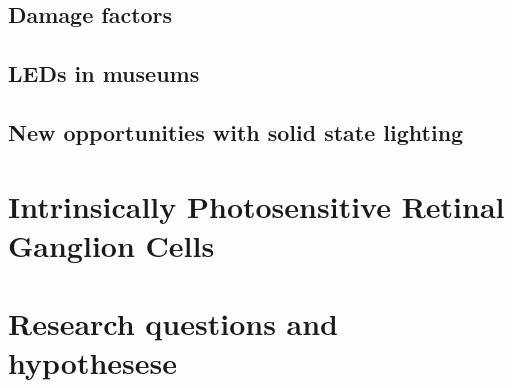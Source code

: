 \subsection{Damage factors}
\subsection{LEDs in museums}
\subsection{New opportunities with solid state lighting}


\section{Intrinsically Photosensitive Retinal Ganglion Cells}
\section{Research questions and hypothesese}
